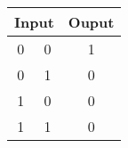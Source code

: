 \documentclass{standalone}
\begin{document}
\begin{tabular}{ccc}
	\toprule
		\multicolumn{2}{c}{Input} & Ouput \\
	\midrule
		0 & 0 & 1 \\
		0 & 1 & 0 \\
		1 & 0 & 0 \\
		1 & 1 & 0 \\
	\bottomrule
\end{tabular}
\end{document}
